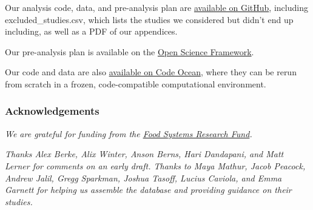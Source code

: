 \documentclass[
  letterpaper,
  DIV=11,
  numbers=noendperiod]{scrartcl}
\begin{document}
Our analysis code, data, and pre-analysis plan are
\href{https://github.com/setgree/vegan-meta/tree/main}{available on
GitHub}, including excluded\_studies.csv, which lists the studies we
considered but didn't end up including, as well as a PDF of our
appendices.

Our pre-analysis plan is available on the
\href{https://osf.io/3sth2}{Open Science Framework}.

Our code and data are also
\href{https://doi.org/10.24433/CO.6020578.v1}{available on Code Ocean},
where they can be rerun from scratch in a frozen, code-compatible
computational environment.

\hypertarget{acknowledgements}{%
\subsubsection{Acknowledgements}\label{acknowledgements}}

\emph{We are grateful for funding from the
\href{https://www.fsrfund.org/}{Food Systems Research Fund}.}

\emph{Thanks Alex Berke, Alix Winter, Anson Berns, Hari Dandapani, and
Matt Lerner for comments on an early draft. Thanks to Maya Mathur, Jacob
Peacock, Andrew Jalil, Gregg Sparkman, Joshua Tasoff, Lucius Caviola,
and Emma Garnett for helping us assemble the database and providing
guidance on their studies.}
\end{document}
